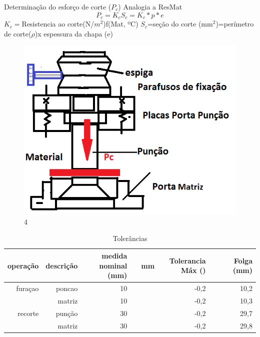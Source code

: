 \documentclass[a4paper, 12pt]{article}
\begin{document}
Determinação do esforço de corte ($P_{c}$)
Analogia a ResMat
\[P_{c}=K_{c}S_{c}=K_{c}*p*e\]
$K_{c}=$Resistencia ao corte(N/$m^{2}$)f(Mat, ºC)
$S_{c}$=seção do corte (mm$^{2}$)=perímetro de corte($\rho$)x espessura da chapa (e)


\begin{figure}[h]
\begin{center}
\includegraphics[scale=0.78]{./fig/4.png}
\caption{\label{fig:1}4} 
\end{center}
\end{figure}

\begin{table}[htbp]
  \centering
  \caption{Tolerâncias}
    \begin{tabular}{rrrrrrrrr}
    \toprule
    operação & descrição & medida nominal (mm) &       & mm    & Tolerancia Máx () &       &       & Folga (mm) \\
    \midrule
    furaçao & poncao & 10    &       &       & -0,2  &       &       & 10,2 \\
          & matriz & 10    &       &       & -0,2  &       &       & 10,3 \\
    recorte & punção & 30    &       &       & -0,2  &       &       & 29,7 \\
          & matriz & 30    &       &       & -0,2  &       &       & 29,8 \\
    \bottomrule
    \end{tabular}%
  \label{tab:addlabel}%
\end{table}%
\end{document}
